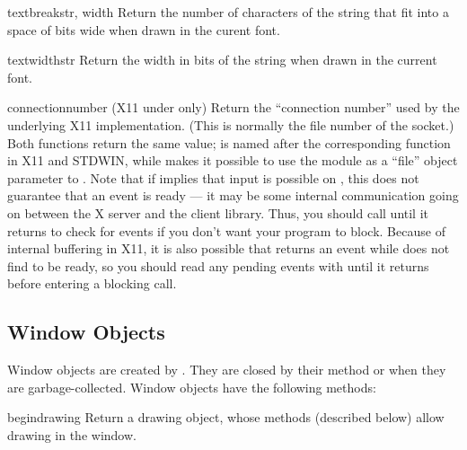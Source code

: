 \begin{funcdesc}{textbreak}{str, width}
Return the number of characters of the string that fit into a space of
bits wide when drawn in the curent font.
\end{funcdesc}

\begin{funcdesc}{textwidth}{str}
Return the width in bits of the string when drawn in the current font.
\end{funcdesc}

\begin{funcdesc}{connectionnumber}{}
(X11 under \UNIX{} only) Return the ``connection number'' used by the
underlying X11 implementation.  (This is normally the file number of
the socket.)  Both functions return the same value;
 is named after the corresponding function in
X11 and STDWIN, while  makes it possible to use the
 module as a ``file'' object parameter to
.  Note that if  implies that
input is possible on , this does not guarantee that an
event is ready --- it may be some internal communication going on
between the X server and the client library.  Thus, you should call
 until it returns  to check for
events if you don't want your program to block.  Because of internal
buffering in X11, it is also possible that 
returns an event while  does not find  to
be ready, so you should read any pending events with
 until it returns  before entering
a blocking  call.
\end{funcdesc}

\subsection{Window Objects}

Window objects are created by .  They are closed
by their  method or when they are garbage-collected.
Window objects have the following methods:


\begin{funcdesc}{begindrawing}{}
Return a drawing object, whose methods (described below) allow drawing
in the window.
\end{funcdesc}

